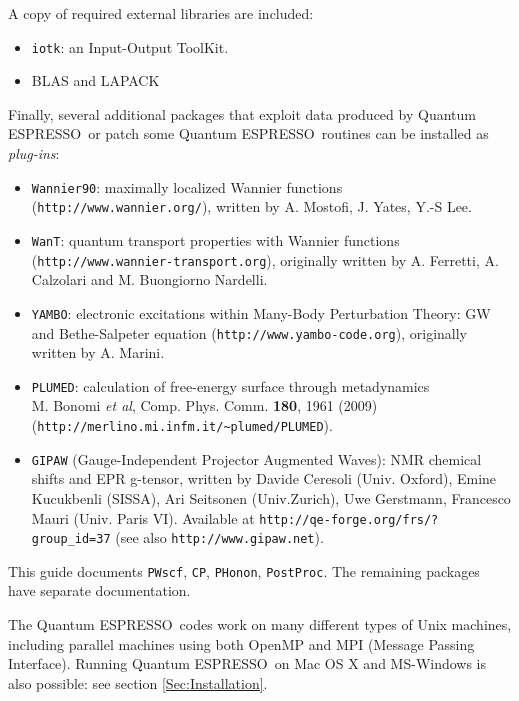 \documentclass[12pt,a4paper]{article}
\def\qe{{\sc Quantum ESPRESSO}}
\def\PWscf{\texttt{PWscf}}
\def\PHonon{\texttt{PHonon}}
\def\CP{\texttt{CP}}
\def\PostProc{\texttt{PostProc}}
\begin{document}
A copy of required external libraries are included:
\begin{itemize}
\item \texttt{iotk}:
      an Input-Output ToolKit.
\item BLAS and LAPACK
\end{itemize}
Finally, several additional packages that exploit data produced by \qe\ 
or patch some \qe\ routines can be installed as {\em plug-ins}:
\begin{itemize}
\item \texttt{Wannier90}:
      maximally localized Wannier functions
      (\texttt{http://www.wannier.org/}), written by A. Mostofi, 
     J. Yates, Y.-S Lee.
\item \texttt{WanT}:
      quantum transport properties with Wannier functions \\
      (\texttt{http://www.wannier-transport.org}), originally written by 
      A. Ferretti, A. Calzolari and M. Buongiorno Nardelli.
\item \texttt{YAMBO}:
      electronic excitations within Many-Body Perturbation Theory: GW and Bethe-Salpeter equation 
      (\texttt{http://www.yambo-code.org}), originally written by A. Marini.
\item \texttt{PLUMED}:
      calculation of free-energy surface through metadynamics \\
      M. Bonomi {\it et al}, Comp. Phys. Comm. {\bf 180}, 1961 (2009) \\
      (\texttt{http://merlino.mi.infm.it/\~{}plumed/PLUMED}).
\item \texttt{GIPAW} (Gauge-Independent Projector Augmented Waves):
      NMR chemical shifts and EPR g-tensor, written by Davide Ceresoli 
      (Univ. Oxford), Emine Kucukbenli (SISSA), Ari Seitsonen (Univ.Zurich),
      Uwe Gerstmann,  Francesco Mauri (Univ. Paris VI).
      Available at \texttt{http://qe-forge.org/frs/?group\_id=37}
      (see also \texttt{http://www.gipaw.net}).
\end{itemize}
This guide documents \PWscf, \CP, \PHonon, \PostProc.
The remaining packages have separate documentation.

The \qe\ codes work on many different types of Unix machines,
including parallel machines using both OpenMP and MPI 
(Message Passing Interface).
Running \qe\ on Mac OS X and MS-Windows is also possible: 
see section \ref{Sec:Installation}.
\end{document}
